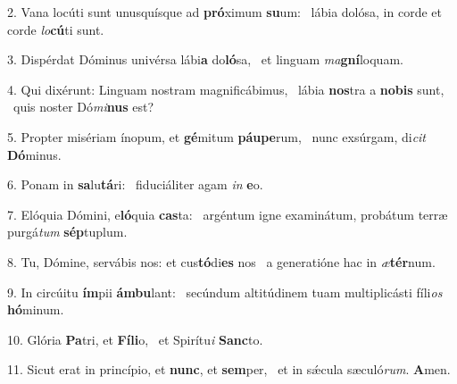 2. Vana locúti sunt unusquísque ad \textbf{pró}ximum \textbf{su}um: \ast\  lábia dolósa, in corde et corde \textit{lo}\textbf{cú}ti sunt.\

3. Dispérdat Dóminus univérsa lábi\textbf{a} do\textbf{ló}sa, \ast\  et linguam \textit{ma}\textbf{gní}loquam.\

4. Qui dixérunt: Linguam nostram magnificábimus, \dag\  lábia \textbf{nos}tra a \textbf{no}\textbf{bis} sunt, \ast\  quis noster Dó\textit{mi}\textbf{nus} est?\

5. Propter misériam ínopum, et \textbf{gé}mitum \textbf{páu}\textbf{pe}rum, \ast\  nunc exsúrgam, di\textit{cit} \textbf{Dó}minus.\

6. Ponam in \textbf{sa}lu\textbf{tá}ri: \ast\  fiduciáliter agam \textit{in} \textbf{e}o.\

7. Elóquia Dómini, e\textbf{ló}quia \textbf{cas}ta: \ast\  argéntum igne examinátum, probátum terræ purgá\textit{tum} \textbf{sép}tuplum.\

8. Tu, Dómine, servábis nos: et cus\textbf{tó}di\textbf{es} nos \ast\  a generatióne hac in \textit{æ}\textbf{tér}num.\

9. In circúitu \textbf{ím}pii \textbf{ám}\textbf{bu}lant: \ast\  secúndum altitúdinem tuam multiplicásti fíli\textit{os} \textbf{hó}minum.\

10. Glória \textbf{Pa}tri, et \textbf{Fí}\textbf{li}o, \ast\  et Spirítu\textit{i} \textbf{Sanc}to.\

11. Sicut erat in princípio, et \textbf{nunc}, et \textbf{sem}per, \ast\  et in sǽcula sæculó\textit{rum}. \textbf{A}men.\

